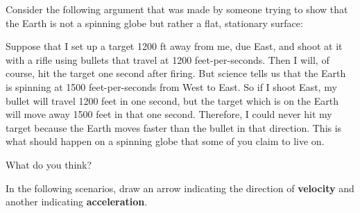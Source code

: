 \documentclass[12pt]{exam}
\begin{document}
\begin{questions}
\begin{parts}
\end{parts}


\question
Consider the following argument that was made by someone trying to show that the Earth is not a spinning globe but rather a flat, stationary surface:

Suppose that I set up a target 1200 ft away from me, due East, and shoot at it with a rifle using bullets that travel at 1200 feet-per-seconds. Then I will, of course, hit the target one second after firing. But science tells us that the Earth is spinning at 1500 feet-per-seconds from West to East. So if I shoot East, my bullet will travel 1200 feet in one second, but the target which is on the Earth will move away 1500 feet in that one second. Therefore, I could never hit my target because the Earth moves faster than the bullet in that direction. This is what should happen on a spinning globe that some of you claim to live on.

What do you think?

\clearpage

\question
In the following scenarios, draw an arrow indicating the direction of \textbf{velocity} and another indicating \textbf{acceleration}.

\end{questions}
\end{document}
